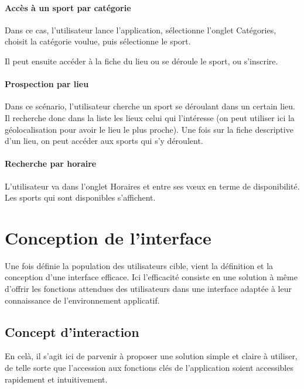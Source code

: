 \documentclass[french, titlepage, 11pt, a4paper]{article}
\begin{document}
        \paragraph{Accès à un sport par catégorie}

            Dans ce cas, l'utilisateur lance l'application, sélectionne l'onglet
            Catégories, choisit la catégorie voulue, puis sélectionne le sport.

            Il peut ensuite accéder à la fiche du lieu ou se déroule le sport, ou s'inscrire.

        \paragraph{Prospection par lieu}

            Dans ce scénario, l'utilisateur cherche un sport se déroulant dans un
            certain lieu. Il recherche donc dans la liste les lieux celui qui
            l'intéresse (on peut utiliser ici la géolocalisation pour avoir le
            lieu le plus proche). Une fois sur la fiche descriptive d'un lieu,
            on peut accéder aux sports qui s'y déroulent.

        \paragraph{Recherche par horaire}

            L'utilisateur va dans l'onglet \og Horaires\fg{} et entre ses vœux
            en terme de disponibilité. Les sports qui sont disponibles s'affichent.

\section{Conception de l'interface}

Une fois définie la population des utilisateurs cible, vient la définition et la
conception d'une interface efficace.
Ici l'efficacité consiste en une solution à même d'offrir les fonctions
attendues des utilisateurs dans une interface adaptée à leur connaissance de
l'environnement applicatif.

	\subsection{Concept d'interaction}

	En celà, il s'agit ici de parvenir à proposer une solution simple et claire à
	utiliser, de telle sorte que l'accession aux fonctions clés de l'application
	soient accessibles rapidement et intuitivement.
\end{document}
